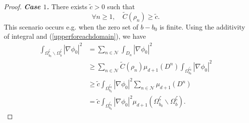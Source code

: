 \documentclass[11pt]{article}
\begin{document}
\begin{proof}
	\vspace*{0.25cm}
	\noindent  \textit{\bf  Case $1$.} \vspace*{0.25cm}
	There exists $\widetilde{c}>0$ such that 
	$$\forall n\geq1,\quad \widetilde{C}(\rho_n)\geq \widetilde{c}. $$
	This scenario occurs e.g. when the zero set of $b-b_0$ is finite. 
	Using the additivity of integral and (\ref{upperforeachdomain}), we have 
	\begin{equation*}
		\begin{split}
			\displaystyle\int_{\Omega_{b_0}^{\underline{\zeta}}\backslash \Omega_{b}^{\underline{\zeta}}}\left|\nabla\phi_0\right|^2&=\displaystyle\sum_{
				n\in \mathcal N}\displaystyle\int_{D_n}|\nabla\phi_0|^2\\
			&\geq \displaystyle\sum_{n\in \mathcal N }\widetilde{C}(\rho_n)\mu_{d+1} (D^n)\displaystyle\int_{\Omega_{b_0}^{\zeta_0}}|\nabla\phi_0|^2\\
			&\geq \widetilde{c}\displaystyle\int_{\Omega_{b_0}^{\zeta_0}}|\nabla\phi_0|^2\displaystyle\sum_{n\in \mathcal N} \mu_{d+1} (D^n)\\
			&=\widetilde{c}\displaystyle\int_{\Omega_{b_0}^{\zeta_0}}|\nabla\phi_0|^2\mu_{d+1} (\Omega_{b_0}^{\underline{\zeta}}\backslash\Omega_b^{\underline{\zeta}}).
		\end{split}
	\end{equation*}
	

\end{proof}
\end{document}
